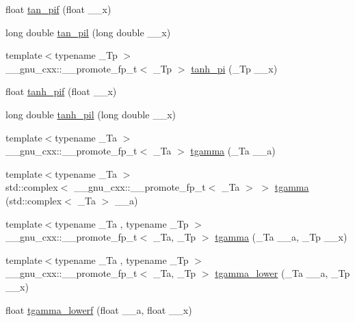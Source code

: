 \begin{DoxyCompactItemize}
\item 
float \hyperlink{group__gnu__math__spec__func_gaab32e2d76da811451e84232320ddf80c}{tan\+\_\+pif} (float \+\_\+\+\_\+x)
\item 
long double \hyperlink{group__gnu__math__spec__func_ga3546906a5bb8f128c893dddef72e2f20}{tan\+\_\+pil} (long double \+\_\+\+\_\+x)
\item 
{\footnotesize template$<$typename \+\_\+\+Tp $>$ }\\\+\_\+\+\_\+gnu\+\_\+cxx\+::\+\_\+\+\_\+promote\+\_\+fp\+\_\+t$<$ \+\_\+\+Tp $>$ \hyperlink{group__gnu__math__spec__func_ga5f0c92cb16210a8d087327ff2c048115}{tanh\+\_\+pi} (\+\_\+\+Tp \+\_\+\+\_\+x)
\item 
float \hyperlink{group__gnu__math__spec__func_gab6cbfb582127f997ad9a198903d08889}{tanh\+\_\+pif} (float \+\_\+\+\_\+x)
\item 
long double \hyperlink{group__gnu__math__spec__func_ga4bc71ee5cf3df2ba35e6504027e5c6c6}{tanh\+\_\+pil} (long double \+\_\+\+\_\+x)
\item 
{\footnotesize template$<$typename \+\_\+\+Ta $>$ }\\\+\_\+\+\_\+gnu\+\_\+cxx\+::\+\_\+\+\_\+promote\+\_\+fp\+\_\+t$<$ \+\_\+\+Ta $>$ \hyperlink{group__gnu__math__spec__func_gac76f330d5eed535fc5936b9625099fdf}{tgamma} (\+\_\+\+Ta \+\_\+\+\_\+a)
\item 
{\footnotesize template$<$typename \+\_\+\+Ta $>$ }\\std\+::complex$<$ \+\_\+\+\_\+gnu\+\_\+cxx\+::\+\_\+\+\_\+promote\+\_\+fp\+\_\+t$<$ \+\_\+\+Ta $>$ $>$ \hyperlink{group__gnu__math__spec__func_ga6133351c7602e917fd08d62d897e57d0}{tgamma} (std\+::complex$<$ \+\_\+\+Ta $>$ \+\_\+\+\_\+a)
\item 
{\footnotesize template$<$typename \+\_\+\+Ta , typename \+\_\+\+Tp $>$ }\\\+\_\+\+\_\+gnu\+\_\+cxx\+::\+\_\+\+\_\+promote\+\_\+fp\+\_\+t$<$ \+\_\+\+Ta, \+\_\+\+Tp $>$ \hyperlink{group__gnu__math__spec__func_ga5e8ff98ee1e04d90965f2a8b2f639a18}{tgamma} (\+\_\+\+Ta \+\_\+\+\_\+a, \+\_\+\+Tp \+\_\+\+\_\+x)
\item 
{\footnotesize template$<$typename \+\_\+\+Ta , typename \+\_\+\+Tp $>$ }\\\+\_\+\+\_\+gnu\+\_\+cxx\+::\+\_\+\+\_\+promote\+\_\+fp\+\_\+t$<$ \+\_\+\+Ta, \+\_\+\+Tp $>$ \hyperlink{group__gnu__math__spec__func_ga973fba718e906a5179d954c56b991c8d}{tgamma\+\_\+lower} (\+\_\+\+Ta \+\_\+\+\_\+a, \+\_\+\+Tp \+\_\+\+\_\+x)
\item 
float \hyperlink{group__gnu__math__spec__func_ga8f2aabeaa29d21b19c43972efb26798c}{tgamma\+\_\+lowerf} (float \+\_\+\+\_\+a, float \+\_\+\+\_\+x)

\end{DoxyCompactItemize}
